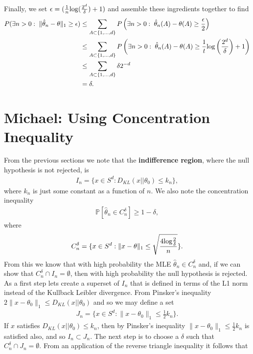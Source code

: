\documentclass[11pt]{article}
\def\log{{\rm log}}
\begin{document}
Finally, we set  $\epsilon = (\frac{1}{n}\log(\frac{2^d}{\delta}) + 1)$ and assemble these ingredients together to find
\begin{align*}
  P(\exists n > 0:\; \Vert \hat\theta_n - \theta\Vert_1 \geq \epsilon)
  &\leq
  \sum_{A \subset \{1,\ldots, d\}}
  P\left(\exists n > 0:\; \hat\theta_n(A) - \theta(A) \geq \frac{\epsilon}{2}\right)\\
  &\leq
  \sum_{A \subset \{1,\ldots, d\}}
  P\left(\exists n > 0:\; \hat\theta_n(A) - \theta(A) \geq
    \frac{1}{t}\log\left(\frac{2^d}{\delta}\right) + 1
    \right)\\
  &\leq
  \sum_{A \subset \{1,\ldots, d\}}
    \delta 2^{-d}\\
  & =
    \delta.
\end{align*}

\section{Michael: Using Concentration Inequality}
From the previous sections we note that the \textbf{indifference region}, where
the null hypothesis is not rejected, is
\begin{align}
  I_n = \lbrace x \in S^d : D_{KL}(x||\theta_0) \leq k_n \rbrace,
\end{align}
where $k_n$ is just some constant as a function of $n$. We also note the concentration inequality
\begin{align}
  \mathbb{P}[\hat{\theta}_n \in C_n^{\delta}] \geq 1-\delta,
\end{align}
where
\begin{align}
  C_n^{\delta}=\lbrace x \in S^d : \|x-\theta\|_1 \leq \sqrt{\frac{4\log \frac{2}{\delta}}{n}}\rbrace.
\end{align}
From this we know that with high probability the MLE $\hat{\theta}_n \in C_n^{\delta}$ and, if we can show that $C_n^{\delta} \cap I_n = \emptyset$, then with high probability the null hypothesis is rejected. As a first step lets create a superset of $I_n$ that is defined in terms of the L1 norm instead of the Kullback Leibler divergence. From Pinsker's inequality $2\|x-\theta_0\|_1 \leq D_{KL}(x||\theta_0)$ and so we may define a set
\begin{align}
  J_n = \lbrace x \in S^d : \|x-\theta_0\|_1 \leq \frac{1}{2}k_n \rbrace.
\end{align}
If $x$ satisfies $D_{KL}(x||\theta_0) \leq k_n$, then by Pinsker's inequality $\|x-\theta_0\|_1 \leq \frac{1}{2}k_n$ is satisfied also, and so $I_n \subset J_n$. The next step is to choose a $\delta$ such that $C_n^\delta \cap  J_n = \emptyset$. From an application of the reverse triangle inequality it follows that
\end{document}

